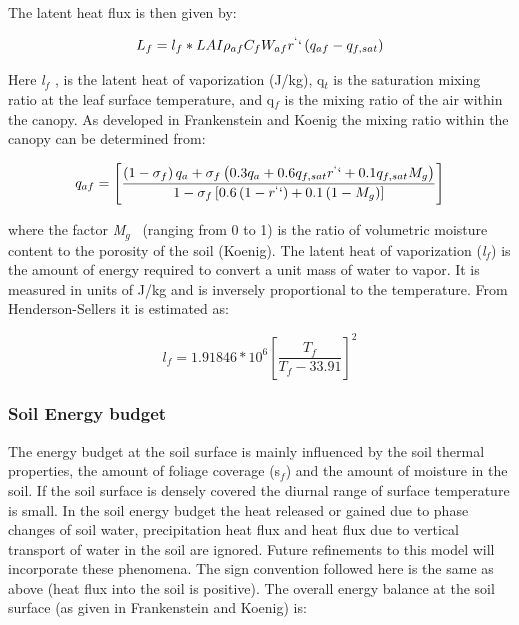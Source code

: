 The latent heat flux is then given by:

\begin{equation}
{L_f} = {l_f} * LAI{\rho_{af}}{C_f}{W_{af}}{r^``}\left( {{q_{af}} - {q_{f,sat}}} \right)
\end{equation}

Here \emph{l\(_{f}\)} , is the latent heat of vaporization (J/kg), q\(_{t}\) is the saturation mixing ratio at the leaf surface temperature, and q\(_{f}\) is the mixing ratio of the air within the canopy. As developed in Frankenstein and Koenig the mixing ratio within the canopy can be determined from:

\begin{equation}
{q_{af}} = \left[ {\frac{{\left( {1 - {\sigma_f}} \right){q_a} + {\sigma_f}\left( {0.3{q_a} + 0.6{q_{f,sat}}{r^``} + 0.1{q_{f,sat}}{M_g}} \right)}}{{1 - {\sigma_f}\left[ {0.6\left( {1 - {r^``}} \right) + 0.1\left( {1 - {M_g}} \right)} \right]}}} \right]
\end{equation}

where the factor \emph{M\(_{g}\)} ~(ranging from 0 to 1) is the ratio of volumetric moisture content to the porosity of the soil (Koenig). The latent heat of vaporization (\emph{l\(_{f}\)}) is the amount of energy required to convert a unit mass of water to vapor. It is measured in units of J/kg and is inversely proportional to the temperature. From Henderson-Sellers it is estimated as:

\begin{equation}
{l_f} = 1.91846*{10^6}{\left[ {\frac{{{T_f}}}{{{T_f} - 33.91}}} \right]^2}
\end{equation}

\subsubsection{Soil Energy budget}\label{soil-energy-budget}

The energy budget at the soil surface is mainly influenced by the soil thermal properties, the amount of foliage coverage (s\(_{f}\)) and the amount of moisture in the soil. If the soil surface is densely covered the diurnal range of surface temperature is small. In the soil energy budget the heat released or gained due to phase changes of soil water, precipitation heat flux and heat flux due to vertical transport of water in the soil are ignored. Future refinements to this model will incorporate these phenomena. The sign convention followed here is the same as above (heat flux into the soil is positive). The overall energy balance at the soil surface (as given in Frankenstein and Koenig) is:

